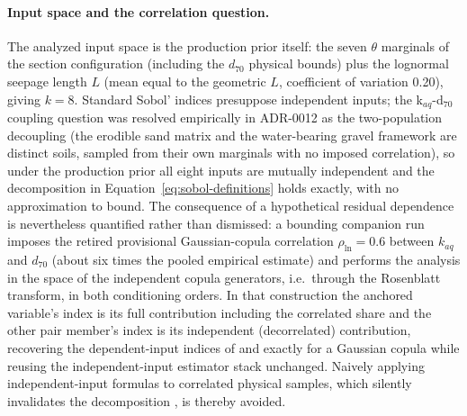 \paragraph{Input space and the correlation question.}
The analyzed input space is the production prior itself: the seven $\theta$
marginals of the section configuration (including the $d_{70}$ physical
bounds) plus the lognormal seepage length $L$ (mean equal to the geometric
$L$, coefficient of variation 0.20), giving $k = 8$. Standard Sobol'
indices presuppose independent inputs; the k$_{aq}$-d$_{70}$ coupling
question was resolved empirically in ADR-0012 as the two-population
decoupling (the erodible sand matrix and the water-bearing gravel framework
are distinct soils, sampled from their own marginals with no imposed
correlation), so under the production prior all eight inputs are mutually
independent and the decomposition in
Equation~\eqref{eq:sobol-definitions} holds exactly, with no
approximation to bound. The consequence of a hypothetical residual
dependence is nevertheless quantified rather than dismissed: a bounding
companion run imposes the retired provisional Gaussian-copula correlation
$\rho_{\ln} = 0.6$ between $k_{aq}$ and $d_{70}$ (about six times the
pooled empirical estimate) and performs the analysis in the space of the
independent copula generators, i.e.\ through the Rosenblatt transform, in
both conditioning orders. In that construction the anchored variable's
index is its full contribution including the correlated share and the other
pair member's index is its independent (decorrelated) contribution,
recovering the dependent-input indices of \textcite{mara_tarantola_2012}
and \textcite{kucherenko_2012} exactly for a Gaussian copula while reusing
the independent-input estimator stack unchanged. Naively applying
independent-input formulas to correlated physical samples, which silently
invalidates the decomposition \parencite[p.~162]{saltelli_primer_2008}, is
thereby avoided.

